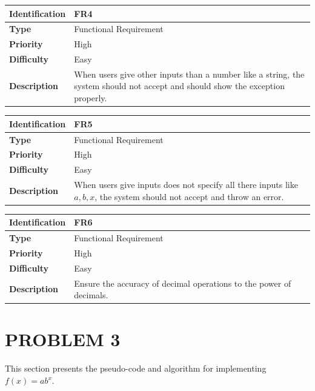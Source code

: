 \documentclass[11pt]{article}
\begin{document}
\begin{center}
    \begin{tabular}{|p{3cm}|p{11cm}| }
    \hline
    \textbf{Identification} &  FR4 \\ \hline 
    \textbf{Type} & Functional Requirement\\ \hline 
    \textbf{Priority} & High  \\ \hline
    \textbf{Difficulty} & Easy  \\ \hline
    \textbf{Description} & When users give other inputs than a number like a string, the system should not accept and should show the exception properly.\\ \hline
\end{tabular}
\end{center}

\begin{center}
    \begin{tabular}{|p{3cm}|p{11cm}| }
    \hline
    \textbf{Identification} &  FR5 \\ \hline 
    \textbf{Type} & Functional Requirement\\ \hline 
    \textbf{Priority} & High  \\ \hline
    \textbf{Difficulty} & Easy  \\ \hline
    \textbf{Description} & When users give inputs does not specify all there inputs like $a, b, x$, the system should not accept and throw an error.\\ \hline
\end{tabular}
\end{center}

\begin{center}
    \begin{tabular}{|p{3cm}|p{11cm}| }
    \hline
    \textbf{Identification} &  FR6 \\ \hline 
    \textbf{Type} & Functional Requirement\\ \hline 
    \textbf{Priority} & High  \\ \hline
    \textbf{Difficulty} & Easy  \\ \hline
    \textbf{Description} &Ensure the accuracy of decimal operations to the power of decimals.\\ \hline
\end{tabular}
\end{center}

\section{PROBLEM 3}\label{problem3}
This section presents the pseudo-code and algorithm for implementing $f(x)=ab^x$.

\newpage


\end{document}
